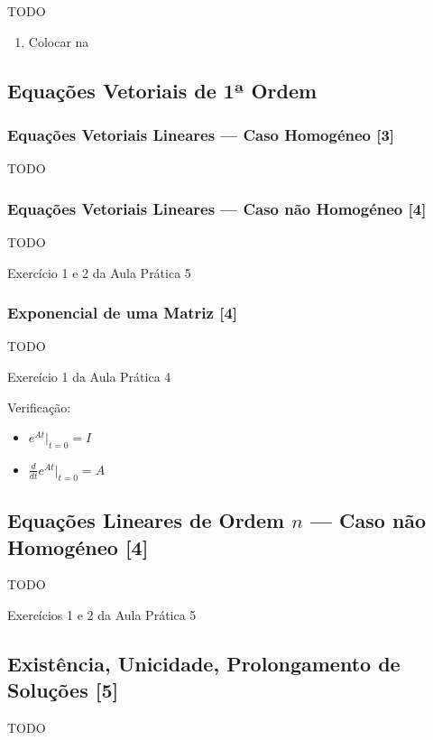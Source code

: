 \documentclass[11pt, a4paper]{article}
\begin{document}
TODO

\begin{enumerate}
    \item Colocar na
\end{enumerate}

\subsection{Equações Vetoriais de 1ª Ordem}

\subsubsection{Equações Vetoriais Lineares — Caso Homogéneo [3]}

TODO

\subsubsection{Equações Vetoriais Lineares — Caso não Homogéneo [4]}

TODO

Exercício 1 e 2 da Aula Prática 5

\subsubsection{Exponencial de uma Matriz [4]}

TODO

Exercício 1 da Aula Prática 4

Verificação:
\begin{itemize}
    \item $\displaystyle e^{At}|_{t=0} = I$
    \item $\displaystyle \frac{d}{dt}e^{At}|_{t=0} = A $
\end{itemize}

\subsection{Equações Lineares de Ordem $n$ — Caso não Homogéneo [4]}

TODO

Exercícios 1 e 2 da Aula Prática 5

\subsection{Existência, Unicidade, Prolongamento de Soluções [5]}

TODO
\end{document}
